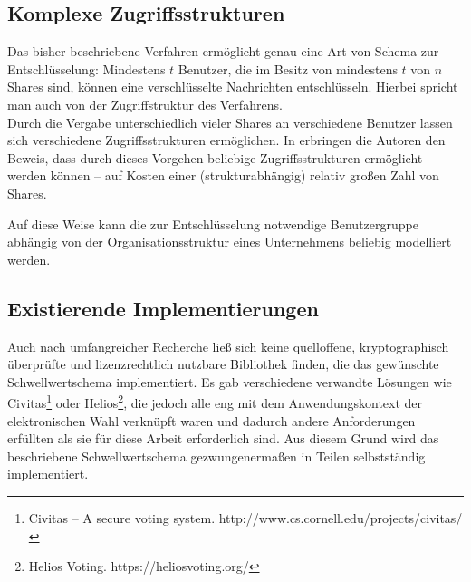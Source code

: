 \subsection{Komplexe Zugriffsstrukturen}
\label{sec_state_threshold_access_structures}

Das bisher beschriebene Verfahren ermöglicht genau eine Art von Schema zur Entschlüsselung: Mindestens \(t\) Benutzer, die im Besitz von mindestens \(t\) von \(n\) Shares sind, können eine verschlüsselte Nachrichten entschlüsseln. Hierbei spricht man auch von der Zugriffstruktur des Verfahrens.\\
Durch die Vergabe unterschiedlich vieler Shares an verschiedene Benutzer lassen sich verschiedene Zugriffsstrukturen ermöglichen. In \cite{ito1989secret} erbringen die Autoren den Beweis, dass durch dieses Vorgehen beliebige Zugriffsstrukturen ermöglicht werden können -- auf Kosten einer (strukturabhängig) relativ großen Zahl von Shares.

Auf diese Weise kann die zur Entschlüsselung notwendige Benutzergruppe abhängig von der Organisationsstruktur eines Unternehmens beliebig modelliert werden.

\subsection{Existierende Implementierungen}

\label{sec_state_threshold_existing_impl}

Auch nach umfangreicher Recherche ließ sich keine quelloffene, kryptographisch überprüfte und lizenzrechtlich nutzbare Bibliothek finden, die das gewünschte Schwellwertschema implementiert. Es gab verschiedene verwandte Lösungen wie Civitas\footnote{
  Civitas -- A secure voting system. http://www.cs.cornell.edu/projects/civitas/
} oder Helios\footnote{
  Helios Voting. https://heliosvoting.org/
}, die jedoch alle eng mit dem Anwendungskontext der elektronischen Wahl verknüpft waren und dadurch andere Anforderungen erfüllten als sie für diese Arbeit erforderlich sind. Aus diesem Grund wird das beschriebene Schwellwertschema gezwungenermaßen in Teilen selbstständig implementiert.